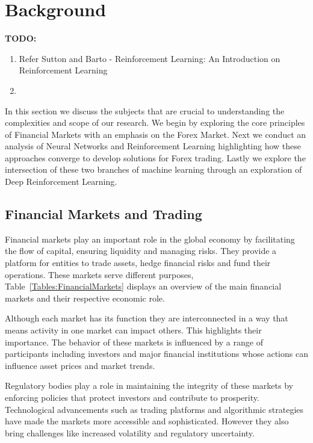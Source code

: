 \section{Background}

\textbf{TODO:}
\begin{enumerate}
\item Refer Sutton and Barto - Reinforcement Learning: An Introduction on Reinforcement Learning
\item 
\end{enumerate}

In this section we discuss the subjects that are crucial to understanding the complexities and scope of our research. We begin by exploring the core principles of Financial Markets with an emphasis on the Forex Market. Next we conduct an analysis of Neural Networks and Reinforcement Learning highlighting how these approaches converge to develop solutions for Forex trading. Lastly we explore the intersection of these two branches of machine learning through an exploration of Deep Reinforcement Learning.

\subsection{Financial Markets and Trading}
Financial markets play an important role in the global economy by facilitating the flow of capital, ensuring liquidity and managing risks. They provide a platform for entities to trade assets, hedge financial risks and fund their operations. These markets serve different purposes, Table~\ref{Tables:FinancialMarkets} displays an overview of the main financial markets and their respective economic role.



Although each market has its function they are interconnected in a way that means activity in one market can impact others. This highlights their importance. The behavior of these markets is influenced by a range of participants including investors and major financial institutions whose actions can influence asset prices and market trends.

Regulatory bodies play a role in maintaining the integrity of these markets by enforcing policies that protect investors and contribute to prosperity. Technological advancements such as trading platforms and algorithmic strategies have made the markets more accessible and sophisticated. However they also bring challenges like increased volatility and regulatory uncertainty.

